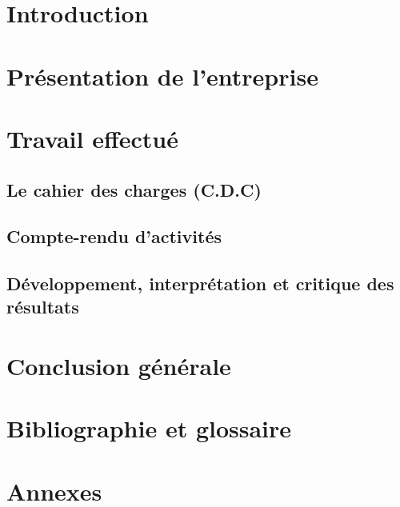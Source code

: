 \documentclass[12pt,a4paper]{report}
\begin{document}
\chapter{Introduction}


\chapter{Présentation de l'entreprise}


\chapter{Travail effectué}
\section{Le cahier des charges (C.D.C)}


\newpage

\section{Compte-rendu d'activités}


\section{Développement, interprétation et critique des résultats}

\chapter{Conclusion générale}

\chapter{Bibliographie et glossaire}
\begin{thebibliography}{99}
\end{thebibliography}

\chapter{Annexes}
\end{document}

